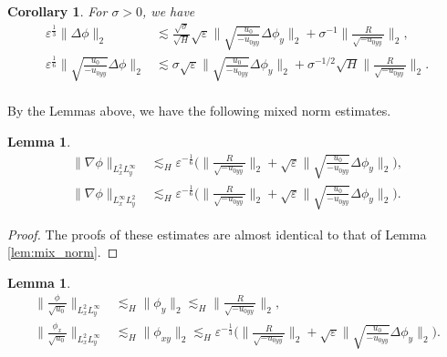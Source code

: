 \documentclass[reqno, 11pt]{amsart}
\theoremstyle{plain}
\newtheorem{lemma}[theorem]{Lemma}
\newtheorem{corollary}[theorem]{Corollary}
\theoremstyle{definition}
\theoremstyle{remark}
\numberwithin{equation}{section}
\begin{document}
\begin{corollary}
For $\sigma > 0$, we have
\begin{equation}\label{est:H_weighted_Hardy}
\begin{aligned}
\varepsilon^{\frac{1}{3}}\| \Delta \phi\|_2 & \lesssim \frac{\sqrt\sigma}{\sqrt{H}} \sqrt\varepsilon \| \sqrt{\frac{u_0}{-u_{0yy}}} \Delta \phi_y\|_2 + \sigma^{-1} \|\frac{R}{\sqrt{-u_{0yy}}}\|_2,\\
\varepsilon^{\frac{1}{6}}\| \sqrt{\frac{u_0}{-u_{0yy}}}  \Delta \phi\|_2 & \lesssim \sigma \sqrt\varepsilon \| \sqrt{\frac{u_0}{-u_{0yy}}} \Delta \phi_y\|_2 + \sigma^{-1/2} \sqrt{H}  \|\frac{R}{\sqrt{-u_{0yy}}}\|_2.\\
\end{aligned}
\end{equation}
\end{corollary}

By the Lemmas above, we have the following mixed norm estimates.

\begin{lemma}\label{lem:mix_norm_H}
\begin{equation}\label{est:mix_norm_H}
\begin{aligned}
\| \nabla \phi\|_{L^2_x L^\infty_y} &\lesssim_H \varepsilon^{-\frac{1}{6}} \Big( \|\frac{R}{\sqrt{-u_{0yy}}}\|_2 + \sqrt{\varepsilon} \| \sqrt{\frac{u_0}{-u_{0yy}}} \Delta \phi_y\|_2\Big),\\
\| \nabla \phi\|_{L^\infty_x L^2_y} &\lesssim_H \varepsilon^{-\frac{1}{6}}  \Big( \|\frac{R}{\sqrt{-u_{0yy}}}\|_2 + \sqrt{\varepsilon} \| \sqrt{\frac{u_0}{-u_{0yy}}} \Delta \phi_{y}\|_2\Big).
\end{aligned}
\end{equation}
\end{lemma}

\begin{proof}
The proofs of these estimates are almost identical to that of Lemma \ref{lem:mix_norm}.
\end{proof}

\begin{lemma}\label{lem:mix_norm_Hardy}
\begin{equation}\label{est:mix_norm_Hardy}
\begin{aligned}
\| \frac{\phi}{\sqrt{u_0}}\|_{L^2_x L^\infty_y} &\lesssim_H \|\phi_y\|_2 \lesssim_H \|\frac{R}{\sqrt{-u_{0yy}}}\|_2,\\
\| \frac{\phi_x}{\sqrt{u_0}}\|_{L^2_x L^\infty_y} &\lesssim_H \|\phi_{xy}\|_2 \lesssim_H \varepsilon^{-\frac{1}{3}} \Big( \|\frac{R}{\sqrt{-u_{0yy}}}\|_2 + \sqrt{\varepsilon} \| \sqrt{\frac{u_0}{-u_{0yy}}} \Delta \phi_{y}\|_2\Big).
\end{aligned}
\end{equation}
\end{lemma}
\end{document}
